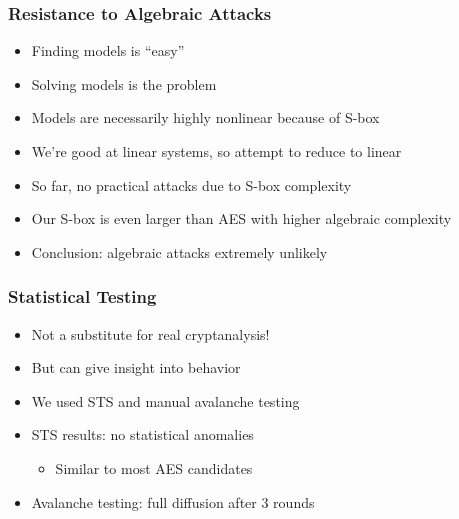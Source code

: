 \begin{frame}
\frametitle{Resistance to Algebraic Attacks}
\begin{itemize}
  \item Finding models is ``easy''
  \item Solving models is the problem
  \item Models are necessarily highly nonlinear because of S-box
  \item We're good at linear systems, so attempt to reduce to linear
  \item So far, no practical attacks due to S-box complexity
  \item Our S-box is even larger than AES with higher algebraic complexity
  \item Conclusion: algebraic attacks extremely unlikely
\end{itemize}
\end{frame}

\begin{frame}
\frametitle{Statistical Testing}
\begin{itemize}
  \item Not a substitute for real cryptanalysis!
  \item But can give insight into behavior
  \item We used STS and manual avalanche testing
  \item STS results: no statistical anomalies
  \begin{itemize}
    \item Similar to most AES candidates
  \end{itemize}
  \item Avalanche testing: full diffusion after 3 rounds
\end{itemize}
\end{frame}

